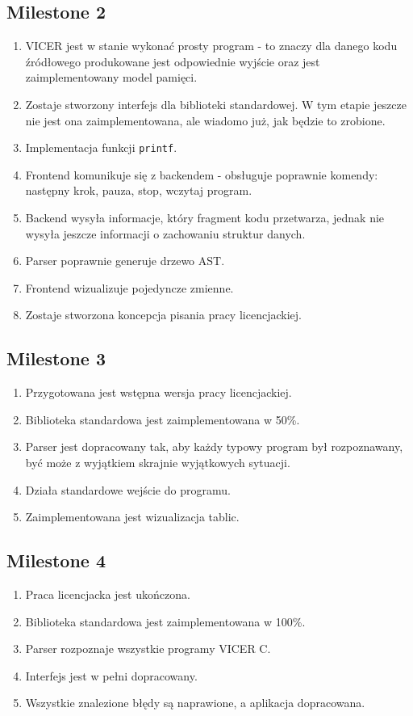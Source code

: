 \documentclass[a4paper,twoside,openright,11pt]{report}
\begin{document}
  \subsection {Milestone 2}
  \begin {enumerate}
    \item VICER jest w stanie wykonać prosty program - to znaczy dla danego kodu źródłowego produkowane jest odpowiednie wyjście oraz jest zaimplementowany model pamięci.
    \item Zostaje stworzony interfejs dla biblioteki standardowej. W tym etapie jeszcze nie jest ona zaimplementowana, ale wiadomo już, jak będzie to zrobione. 
    \item Implementacja funkcji \texttt{printf}.
    \item Frontend komunikuje się z backendem - obsługuje poprawnie komendy: następny krok, pauza, stop, wczytaj program. 
    \item Backend wysyła informacje, który fragment kodu przetwarza, jednak nie wysyła jeszcze informacji o zachowaniu struktur danych.
    \item Parser poprawnie generuje drzewo AST.
    \item Frontend wizualizuje pojedyncze zmienne.
    \item Zostaje stworzona koncepcja pisania pracy licencjackiej.
  \end {enumerate}
  \subsection {Milestone 3}
  \begin {enumerate}
    \item Przygotowana jest wstępna wersja pracy licencjackiej.
    \item Biblioteka standardowa jest zaimplementowana w 50\%. 
    \item Parser jest dopracowany tak, aby każdy typowy program był rozpoznawany, być może z wyjątkiem skrajnie wyjątkowych sytuacji.
    \item Działa standardowe wejście do programu.
    \item Zaimplementowana jest wizualizacja tablic.
  \end {enumerate}
  \subsection {Milestone 4}
  \begin {enumerate}
    \item Praca licencjacka jest ukończona.
    \item Biblioteka standardowa jest zaimplementowana w 100\%.
    \item Parser rozpoznaje wszystkie programy VICER C.
    \item Interfejs jest w pełni dopracowany.
    \item Wszystkie znalezione błędy są naprawione, a aplikacja dopracowana.
  \end {enumerate}
\end{document}
